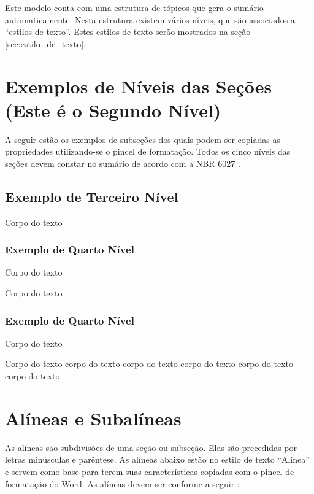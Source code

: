 \documentclass[
        oneside,      %
        english,			
        brazil			 
        ]{configcefetmglpd}
\begin{document}
Este modelo conta com uma estrutura de tópicos que gera o sumário automaticamente. Nesta estrutura existem vários níveis, que são associados a “estilos de texto”. Estes estilos de texto serão mostrados na seção \ref{sec:estilo_de_texto}. %

\section{Exemplos de Níveis das Seções (Este é o Segundo Nível)} %
\label{sec:exemplos_niveis_secao}
A seguir estão os exemplos de subseções dos quais podem ser copiadas as propriedades utilizando-se o pincel de formatação. 
Todos os cinco níveis das seções devem constar no sumário de acordo com a NBR 6027 \cite{bib:abnt6024}.

\subsection{Exemplo de Terceiro Nível} %
Corpo do texto

\subsubsection{Exemplo de Quarto Nível} %
Corpo do texto

Corpo do texto

\subsubsection{Exemplo de Quarto Nível}
Corpo do texto

Corpo do texto corpo do texto corpo do texto corpo do texto corpo do texto corpo do texto.

\section{Alíneas e Subalíneas} \label{sec:alineas_subalineas}
As alíneas são subdivisões de uma seção ou subseção. Elas são precedidas por letras minúsculas e parêntese. 
As alíneas abaixo estão no estilo de texto “Alínea” e servem como base para terem suas características copiadas com o pincel de 
formatação do Word. As alíneas devem ser conforme a seguir \cite{bib:abnt6024}:
\end{document}
